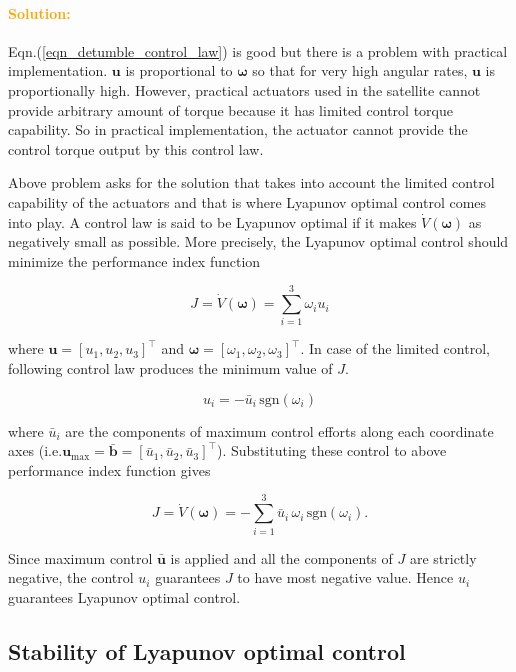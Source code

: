 \documentclass{article}
\begin{document}
\paragraph{\textcolor{orange}{Solution:}}
Eqn.(\ref{eqn_detumble_control_law}) is good but there is a problem with practical implementation. $\bm{u}$ is proportional to $\bm{\omega}$ so that for very high angular rates, $\bm{u}$ is proportionally high. However, practical actuators used in the satellite cannot provide arbitrary amount of torque because it has limited control torque capability. So in practical implementation, the actuator cannot provide the control torque output by this control law.

Above problem asks for the solution that takes into account the limited control capability of the actuators and that is where Lyapunov optimal control comes into play. A control law is said to be Lyapunov optimal if it makes $\dot{V}(\bm{\omega})$ as negatively small as possible. More precisely, the Lyapunov optimal control should minimize the performance index function

$$
J = \dot{V}(\bm{\omega})=\sum_{i=1}^{3}\omega_{i}u_{i}
$$

where $\bm{u}=[u_{1},u_{2},u_{3}]^{\intercal}$ and $\bm{\omega}=[\omega_{1},\omega_{2},\omega_{3}]^{\intercal}$. In case of the limited control, following control law produces the minimum value of $J$.

\begin{equation}
  \label{eqn_saturation_control}
  u_{i}=-\bar{u}_{i}\,\text{sgn}(\omega_{i})  
\end{equation}


where $\bar{u}_{i}$ are the components of maximum control efforts along each coordinate axes (i.e.$\bm{u}_{\text{max}}=\bar{\bm{b}}=[\bar{u}_{1},\bar{u}_{2},\bar{u}_{3}]^{\intercal}$). Substituting these control to above performance index function gives

$$
J=\dot{V}(\bm{\omega})=-\sum_{i=1}^{3}\bar{u}_{i}\,\omega_{i}\,\text{sgn}(\omega_{i}).
$$

Since maximum control $\bar{\bm{u}}$ is applied and all the components of $J$ are strictly negative, the control $u_{i}$ guarantees $J$ to have most negative value. Hence  $u_{i}$ guarantees Lyapunov optimal control.

\subsection*{Stability of Lyapunov optimal control}
\end{document}
